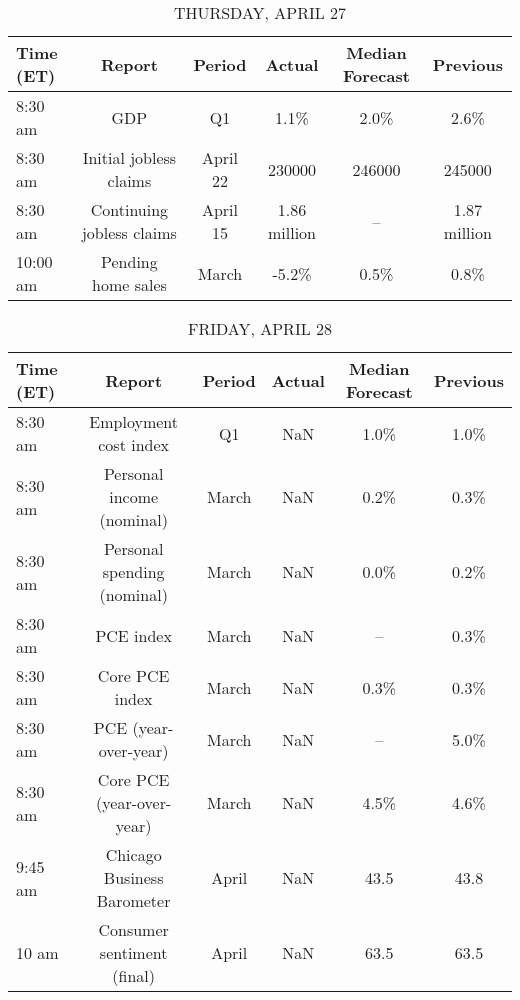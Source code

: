 \documentclass{article}%
\begin{document}
%


\begin{table}[htbp]%
\caption{THURSDAY, APRIL 27}%
\centering%
\begin{adjustbox}{width=1\textwidth}%
\begin{tabular}{lccccc}
\toprule
Time (ET) &                    Report &   Period &       Actual & Median Forecast &     Previous \\
\midrule
  8:30 am &                       GDP &       Q1 &         1.1\% &            2.0\% &         2.6\% \\
  8:30 am &    Initial jobless claims & April 22 &       230000 &          246000 &       245000 \\
  8:30 am & Continuing jobless claims & April 15 & 1.86 million &              -- & 1.87 million \\
 10:00 am &        Pending home sales &    March &        -5.2\% &            0.5\% &         0.8\% \\
\bottomrule
\end{tabular}
%
\end{adjustbox}%
\end{table}

%


\begin{table}[htbp]%
\caption{FRIDAY, APRIL 28}%
\centering%
\begin{adjustbox}{width=1\textwidth}%
\begin{tabular}{lccccc}
\toprule
Time (ET) &                      Report & Period & Actual & Median Forecast & Previous \\
\midrule
  8:30 am &       Employment cost index &     Q1 &    NaN &            1.0\% &     1.0\% \\
  8:30 am &   Personal income (nominal) &  March &    NaN &            0.2\% &     0.3\% \\
  8:30 am & Personal spending (nominal) &  March &    NaN &            0.0\% &     0.2\% \\
  8:30 am &                   PCE index &  March &    NaN &              -- &     0.3\% \\
  8:30 am &              Core PCE index &  March &    NaN &            0.3\% &     0.3\% \\
  8:30 am &        PCE (year-over-year) &  March &    NaN &              -- &     5.0\% \\
  8:30 am &   Core PCE (year-over-year) &  March &    NaN &            4.5\% &     4.6\% \\
  9:45 am &  Chicago Business Barometer &  April &    NaN &            43.5 &     43.8 \\
    10 am &  Consumer sentiment (final) &  April &    NaN &            63.5 &     63.5 \\
\bottomrule
\end{tabular}
%
\end{adjustbox}%
\end{table}
\end{document}
